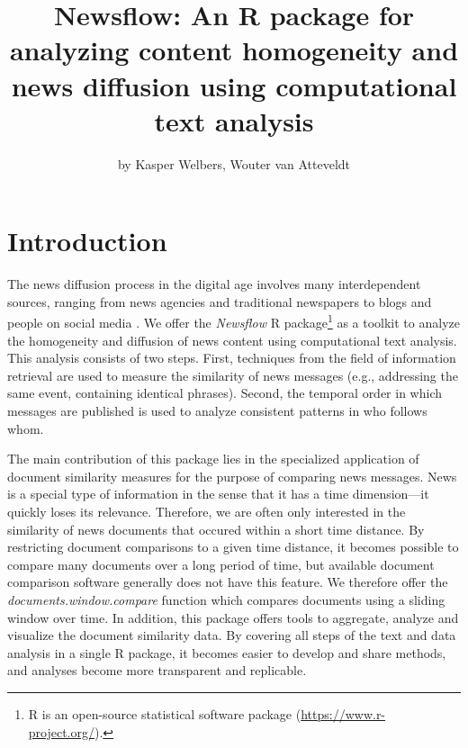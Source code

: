 \title{Newsflow: An R package for analyzing content homogeneity and news
diffusion using computational text analysis}
\author{by Kasper Welbers, Wouter van Atteveldt}

\maketitle


\section{Introduction}

The news diffusion process in the digital age involves many
interdependent sources, ranging from news agencies and traditional
newspapers to blogs and people on social media
\citep{meraz11, paterson05, pew10}. We offer the \emph{Newsflow} R
package\footnote{R is an open-source statistical software package
  (\url{https://www.r-project.org/}).} as a toolkit to analyze the
homogeneity and diffusion of news content using computational text
analysis. This analysis consists of two steps. First, techniques from
the field of information retrieval are used to measure the similarity of
news messages (e.g., addressing the same event, containing identical
phrases). Second, the temporal order in which messages are published is
used to analyze consistent patterns in who follows whom.

The main contribution of this package lies in the specialized
application of document similarity measures for the purpose of comparing
news messages. News is a special type of information in the sense that
it has a time dimension---it quickly loses its relevance. Therefore, we
are often only interested in the similarity of news documents that
occured within a short time distance. By restricting document
comparisons to a given time distance, it becomes possible to compare
many documents over a long period of time, but available document
comparison software generally does not have this feature. We therefore
offer the \emph{documents.window.compare} function which compares
documents using a sliding window over time. In addition, this package
offers tools to aggregate, analyze and visualize the document similarity
data. By covering all steps of the text and data analysis in a single R
package, it becomes easier to develop and share methods, and analyses
become more transparent and replicable.

